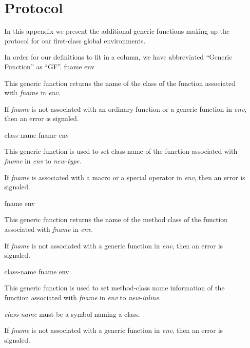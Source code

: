 \appendix

\section{Protocol}
\label{app-protocol}

In this appendix we present the additional generic functions making up
the protocol for our first-class global environments.

In order for our definitions to fit in a column, we have abbreviated
``Generic Function'' as ``GF''.
\vskip 0.2cm
\noindent
{} {fname env}

This generic function returns the name of the class of the function
associated with \textit{fname} in \textit{env}.

If \textit{fname} is not associated with an ordinary function or a
generic function in \textit{env}, then an error is signaled.

\vskip 0.2cm
\noindent
{} {class-name fname env}

This generic function is used to set class name of the
function associated with \textit{fname} in \textit{env}
to \textit{new-type}.

If \textit{fname} is associated with a macro or a special operator
in \textit{env}, then an error is signaled.

\vskip 0.2cm
\noindent
{} {fname env}

This generic function returns the name of the method class of
the function associated with \textit{fname} in \textit{env}.

If \textit{fname} is not associated with a
generic function in \textit{env}, then an error is signaled.

\vskip 0.2cm
\noindent
{} {class-name fname env}

This generic function is used to set method-class name 
information of the function associated with \textit{fname} in
\textit{env} to \textit{new-inline}.

\textit{class-name} must be a symbol naming a class.

If \textit{fname} is not associated with a
generic function in \textit{env}, then an error is signaled.

